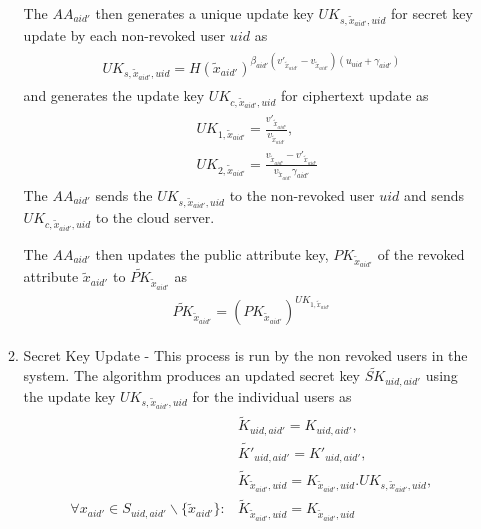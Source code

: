 \begin{enumerate}
\begin{enumerate}
		The $AA_{aid'}$ then generates a unique update key ${UK}_{s,\tilde{x}_{aid'},uid}$ for secret key update by each non-revoked user $uid$ as
		\begin{align}
		\begin{split}
		{UK}_{s,\tilde{x}_{aid'},uid} = H(\tilde{x}_{aid'})^{\beta_{aid'}(v'_{\tilde{x}_{aid'}}-v_{\tilde{x}_{aid'}})(u_{uid}+\gamma_{aid'})}
		\end{split}
		\end{align}
		and generates the update key ${UK}_{c,\tilde{x}_{aid'},uid}$ for ciphertext update as
		\begin{align}
		\begin{split}
		&UK_{1,\tilde{x}_{aid'}} = \frac{v'_{\tilde{x}_{aid'}}}{v_{\tilde{x}_{aid'}}}, \\ &UK_{2,\tilde{x}_{aid'}} = \frac{v_{\tilde{x}_{aid'}} - v'_{\tilde{x}_{aid'}}}{v_{\tilde{x}_{aid'}}\gamma_{aid'}}
		\end{split}
		\end{align}
		The $AA_{aid'}$ sends the ${UK}_{s,\tilde{x}_{aid'},uid}$ to the non-revoked user $uid$ and sends ${UK}_{c,\tilde{x}_{aid'},uid}$ to the cloud server.
		
		The $AA_{aid'}$ then updates the public attribute key, $PK_{\tilde{x}_{aid'}}$ of the revoked attribute $\tilde{x}_{aid'}$ to $\tilde{PK}_{\tilde{x}_{aid'}}$ as
		\begin{align} \label{eq:1}
		\begin{split}
		\tilde{PK}_{\tilde{x}_{aid'}} = ({PK}_{\tilde{x}_{aid'}})^{UK_{1,\tilde{x}_{aid'}}}
		\end{split}
		\end{align}
		
		
		\item Secret Key Update - This process is run by the non revoked users in the system. The algorithm produces an updated secret key $\tilde{SK}_{uid,aid'}$ using the update key ${UK}_{s,\tilde{x}_{aid'},uid}$ for the individual users as
		\begin{align}
		\begin{split}
		&\tilde{K}_{uid,aid'} = {K}_{uid,aid'}, \\ &\tilde{K'}_{uid,aid'} = {K'}_{uid,aid'}, \\
		&\tilde{K}_{\tilde{x}_{aid'},uid} = {K}_{\tilde{x}_{aid'},uid}.{UK}_{s,\tilde{x}_{aid'},uid},\\
		\forall x_{aid'} \in S_{uid,aid'} \backslash \{ \tilde{x}_{aid'} \} \colon &\tilde{K}_{\tilde{x}_{aid'},uid} = {K}_{\tilde{x}_{aid'},uid}
		\end{split} 
		\end{align}
		

\end{enumerate}
\end{enumerate}
